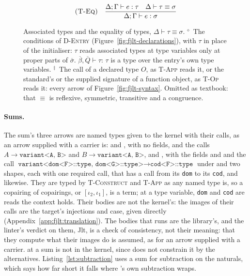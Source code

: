 \begin{figure}[htbp]
\[\begin{array}{@{}l@{\quad}l@{}}
\\[12pt]
\textsc{(T-Eq)} & \dfrac{\Delta; \Gamma \vdash e : \tau \quad \Delta \vdash \tau \equiv \sigma}{\Delta; \Gamma \vdash e : \sigma}
\end{array}
\]
\caption{Associated types and the equality of types, $\Delta \vdash \tau \equiv \sigma$.
$^{\diamond}$~The conditions of \textsc{D-Entry} (Figure~\ref{fig:fjlt-declarations}), with $\tau$ in place of the initialiser: $\tau$ reads associated types at type variables only at proper parts of $\overline{\sigma}$.
$\overline{\beta}, \overline{Q} \vdash \tau$: $\tau$ is a type over the entry's own type variables.
$^{\ddagger}$~The call of a declared type $O$, as \textsc{T-App} reads it, or the standard's or the supplied signature of a function object, as \textsc{T-Op} reads it: every arrow of Figure~\ref{fig:fjlt-syntax}.
Omitted as textbook: that $\equiv$ is reflexive, symmetric, transitive and a congruence.}
\label{fig:fjlt-assoc}
\end{figure}

\paragraph{Sums.}
\label{app:fjlt:sums}
The sum's three arrows are named types given to the kernel with their calls, as an arrow supplied with a carrier is:  and , with no fields, and the calls $A \to \texttt{variant<A, B>}$ and $B \to \texttt{variant<A, B>}$, and , with the fields  and  and the call $\texttt{variant<dom<F>::type, dom<G>::type>} \to \texttt{cod<F>::type}$ under  and two shapes, each with one required call, that  has a call from its \texttt{dom} to its \texttt{cod}, and  likewise.
They are typed by \textsc{T-Construct} and \textsc{T-App} as any named type is, so a copairing of copairings, or $[\iota_2, \iota_1]$, is a term; at a type variable, \texttt{dom} and \texttt{cod} are reads the context holds.
Their bodies are not the kernel's: the images of their calls are the target's injections and case, given directly (Appendix~\ref{app:fjlt:translation}).
The bodies that \Cpp{} runs are the library's, and the linter's verdict on them, Jlt, is a check of consistency, not their meaning: that they compute what their images do is assumed, as for an arrow supplied with a carrier.
\cppinline{==} at a sum is not in the kernel, since  does not constrain it by the alternatives.
Listing~\ref{lst:subtraction} uses a sum for subtraction on the naturals, which says how far short it falls where 's own subtraction wraps.

